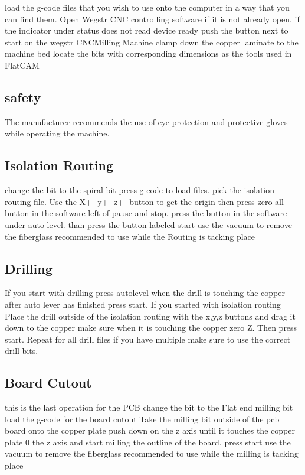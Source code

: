 \documentclass[12pt]{article}
\begin{document}
load the g-code files that you wish to use onto the computer in a way that you can find them. Open Wegstr CNC controlling software if it is not already open.
if the indicator under status does not read device ready push the button next to start on the wegstr CNCMilling Machine 
clamp down the copper laminate to the machine bed 
locate the  bits with corresponding dimensions  as the tools used in FlatCAM

\subsection{safety}
The manufacturer recommends the use of eye protection and protective gloves while operating the machine. 

\subsection{Isolation Routing}
change the bit to the spiral bit
 press g-code to load files. pick the isolation routing file. Use the X+- y+- z+- button to get the origin then press zero all button in the software left of pause and stop.
 press  the button in the software under auto level.
    than press the button labeled start 
use the vacuum to remove the fiberglass recommended to use while the Routing is tacking place  
\subsection{Drilling}

If you start with drilling press autolevel when the drill is touching the copper after auto lever has finished
 press start. If you started with isolation routing Place the drill outside of the isolation routing with
 the x,y,z buttons and drag it down to the copper make sure when it is touching the copper zero Z.
 Then press start. Repeat for all drill files if you have multiple make sure to use the correct drill bits.


\subsection{Board Cutout}
this is the last operation for the PCB  
change the bit to the Flat end milling bit 
load the g-code for the board cutout 
Take the milling bit outside of the pcb board onto the copper plate push down on the z axis until it touches the copper 
plate 0 the z axis and start milling the outline of the board.
press start 
 use the vacuum to remove the fiberglass recommended to use while the milling is tacking place  
\end{document}
